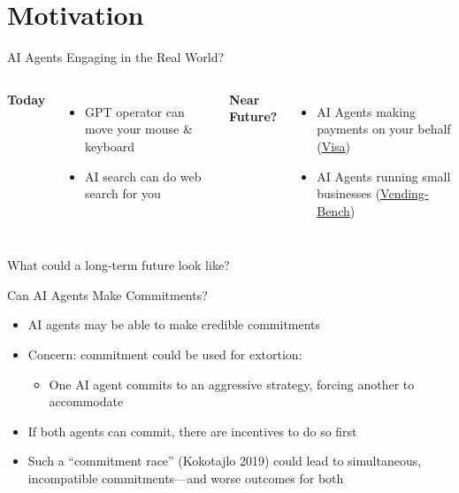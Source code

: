 \documentclass[../slides.tex]{subfiles}
\begin{document}
\section{Motivation}
\begin{frame}{AI Agents Engaging in the Real World?}
  \centering
  \vspace*{-1ex}
  \begin{columns}[t,onlytextwidth]
      \textbf{Today}
      \begin{itemize}
        \item GPT operator can move your mouse \& keyboard
        \item AI search can do web search for you
      \end{itemize}

      \textbf{Near Future?}
      \begin{itemize}
        \item AI Agents making payments on your behalf  
          (\href{https://corporate.visa.com/en/products/intelligent-commerce.html}{Visa})
        \item AI Agents running small businesses  
          (\href{https://andonlabs.com/evals/vending-bench}{Vending-Bench})
      \end{itemize}
  \end{columns}

  \vspace{2em}
  \begin{center}
    \large
    What could a long-term future look like?
  \end{center}
\end{frame}
\begin{frame}{Can AI Agents Make Commitments?}
  \begin{itemize}
    \item AI agents may be able to make credible commitments  
      \parencite{hammond_multi-agent_2025,kokotajlo_commitment_2019}
    \pause
    \vspace{0.5em}
    \item Concern: commitment could be used for extortion:  
    \begin{itemize}
        \item One AI agent commits to an aggressive strategy, forcing another to accommodate
    \end{itemize}

    \vspace{0.5em}
    \item If both agents can commit, there are incentives to do so first

    \vspace{0.5em}
    \item Such a “commitment race” (Kokotajlo 2019) could lead to simultaneous, incompatible commitments—and worse outcomes for both
  \end{itemize}
\end{frame}
\end{document}
